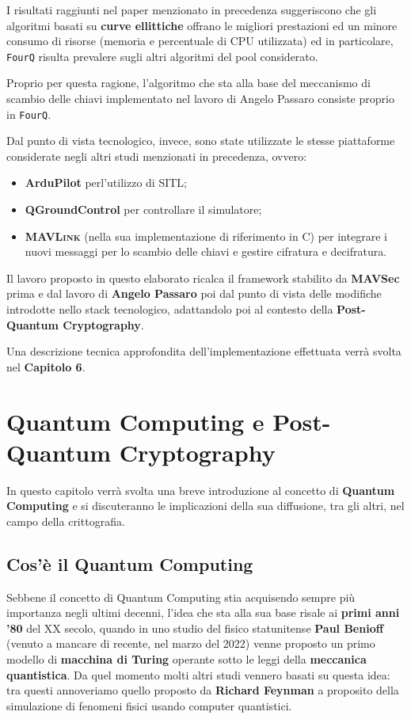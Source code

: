 \documentclass[a4paper, 12pt, oneside]{article}
\theoremstyle{definition}
\begin{document}
I risultati raggiunti nel paper menzionato in precedenza suggeriscono che gli algoritmi basati su \textbf{curve ellittiche} offrano le migliori prestazioni ed un minore consumo di risorse (memoria e percentuale di CPU utilizzata) ed in particolare, \texttt{FourQ} risulta prevalere sugli altri algoritmi del pool considerato.

Proprio per questa ragione, l'algoritmo che sta alla base del meccanismo di scambio delle chiavi implementato nel lavoro di Angelo Passaro consiste proprio in \texttt{FourQ}.

Dal punto di vista tecnologico, invece, sono state utilizzate le stesse piattaforme considerate negli altri studi menzionati in precedenza, ovvero:

\begin{itemize}
    \item \textbf{ArduPilot} perl'utilizzo di SITL;
    \item \textbf{QGroundControl} per controllare il simulatore;
    \item \textbf{\textsc{MAVLink}} (nella sua implementazione di riferimento in C) per integrare i nuovi messaggi per lo scambio delle chiavi e gestire cifratura e decifratura.
\end{itemize}

Il lavoro proposto in questo elaborato ricalca il framework stabilito da \textbf{MAVSec} prima e dal lavoro di \textbf{Angelo Passaro} poi dal punto di vista delle modifiche introdotte nello stack tecnologico, adattandolo poi al contesto della \textbf{Post-Quantum Cryptography}. 

Una descrizione tecnica approfondita dell'implementazione effettuata verrà svolta nel \textbf{Capitolo 6}.

\newpage
\section{Quantum Computing e Post-Quantum Cryptography}
In questo capitolo verrà svolta una breve introduzione al concetto di \textbf{Quantum Computing} e si discuteranno le implicazioni della sua diffusione, tra gli altri, nel campo della crittografia.

\subsection{Cos'è il Quantum Computing}
Sebbene il concetto di Quantum Computing stia acquisendo sempre più importanza negli ultimi decenni, l'idea che sta alla sua base risale ai \textbf{primi anni '80} del XX secolo, quando in uno studio \cite{Benioff1980} del fisico statunitense \textbf{Paul Benioff} (venuto a mancare di recente, nel marzo del 2022) venne proposto un primo modello di \textbf{macchina di Turing} operante sotto le leggi della \textbf{meccanica quantistica}. Da quel momento molti altri studi vennero basati su questa idea: tra questi annoveriamo quello proposto da \textbf{Richard Feynman} a proposito della simulazione di fenomeni fisici usando computer quantistici.
\end{document}
